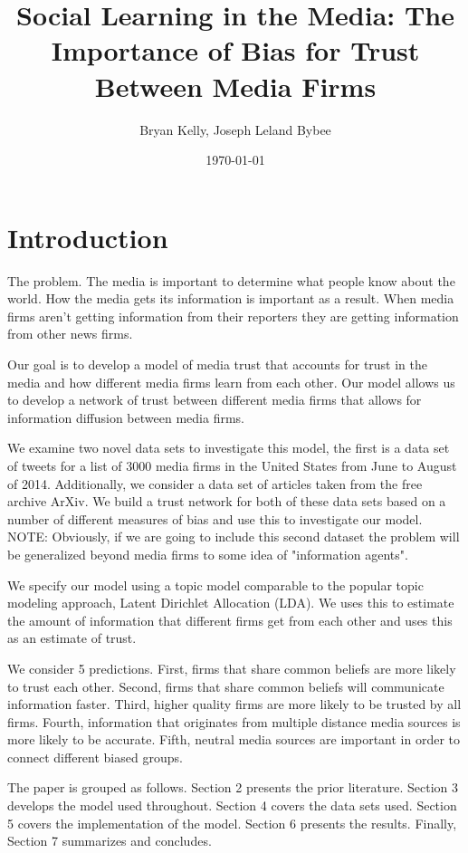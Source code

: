 \documentclass[a4paper]{article}
\title{Social Learning in the Media: The Importance of Bias for Trust Between Media Firms}
\author{Bryan Kelly, Joseph Leland Bybee}
\date{\today}
\begin{document}
\maketitle

\section{Introduction}

The problem.  The media is important to determine what people know about the world.  How the media gets its information is important as a result.  When media firms aren't getting information from their reporters they are getting information from other news firms.

Our goal is to develop a model of media trust that accounts for trust in the media and how different media firms learn from each other.  Our model allows us to develop a network of trust between different media firms that allows for information diffusion between media firms. 

We examine two novel data sets to investigate this model, the first is a data set of tweets for a list of 3000 media firms in the United States from June to August of 2014.  Additionally, we consider a data set of articles taken from the free archive ArXiv.  We build a trust network for both of these data sets based on a number of different measures of bias and use this to investigate our model. NOTE: Obviously, if we are going to include this second dataset the problem will be generalized beyond media firms to some idea of "information agents".

We specify our model using a topic model comparable to the popular topic modeling approach, Latent Dirichlet Allocation (LDA).  We uses this to estimate the amount of information that different firms get from each other and uses this as an estimate of trust.

We consider 5 predictions.  First, firms that share common beliefs are more likely to trust each other.  Second, firms that share common beliefs will communicate information faster.  Third, higher quality firms are more likely to be trusted by all firms.  Fourth, information that originates from multiple distance media sources is more likely to be accurate.  Fifth, neutral media sources are important in order to connect different biased groups. 

The paper is grouped as follows.  Section 2 presents the prior literature.  Section 3 develops the model used throughout.  Section 4 covers the data sets used.  Section 5 covers the implementation of the model.  Section 6 presents the results.  Finally, Section 7 summarizes and concludes.
\end{document}
